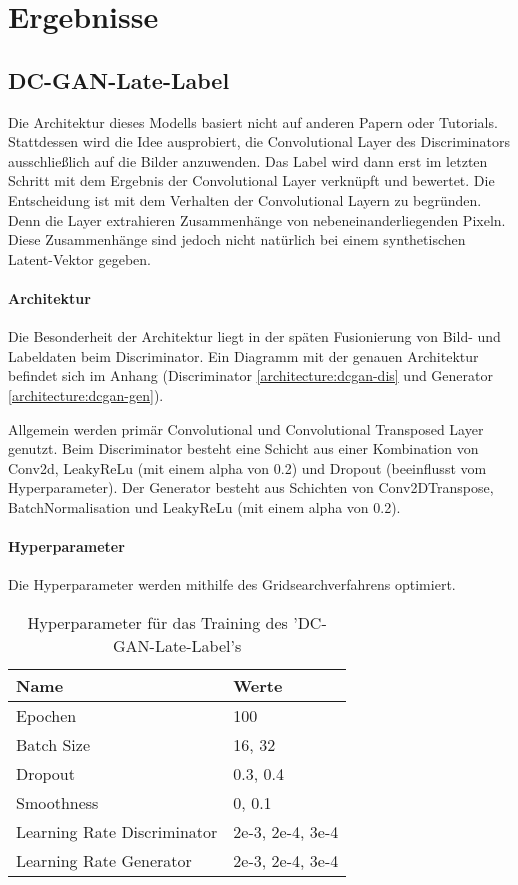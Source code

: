 
\chapter{Ergebnisse}

\section{DC-GAN-Late-Label}
\label{section:dc-gan-late-label}
Die Architektur dieses Modells basiert nicht auf anderen Papern oder Tutorials. 
Stattdessen wird die Idee ausprobiert, die Convolutional Layer des Discriminators ausschließlich auf die Bilder anzuwenden.
Das Label wird dann erst im letzten Schritt mit dem Ergebnis der Convolutional Layer verknüpft und bewertet.
Die Entscheidung ist mit dem Verhalten der Convolutional Layern zu begründen.
Denn die Layer extrahieren Zusammenhänge von nebeneinanderliegenden Pixeln.
Diese Zusammenhänge sind jedoch nicht natürlich bei einem synthetischen Latent-Vektor gegeben.

\subsubsection{Architektur}
Die Besonderheit der Architektur liegt in der späten Fusionierung von Bild- und Labeldaten beim Discriminator.
Ein Diagramm mit der genauen Architektur befindet sich im Anhang (Discriminator \cref{architecture:dcgan-dis} und Generator \cref{architecture:dcgan-gen}).


Allgemein werden primär Convolutional und Convolutional Transposed Layer genutzt.
Beim Discriminator besteht eine Schicht aus einer Kombination von Conv2d, LeakyReLu (mit einem alpha von 0.2) und Dropout (beeinflusst vom Hyperparameter).
Der Generator besteht aus Schichten von Conv2DTranspose, BatchNormalisation und LeakyReLu (mit einem alpha von 0.2).

\subsubsection{Hyperparameter}
Die Hyperparameter werden mithilfe des Gridsearchverfahrens optimiert.
\begin{table}[H]
	\centering
	\begin{tabular}{l l}
		Name                        & Werte            \\ \hline
		Epochen                     & 100              \\
		Batch Size                  & 16, 32           \\
		Dropout                     & 0.3, 0.4         \\
		Smoothness                  & 0, 0.1           \\
		Learning Rate Discriminator & 2e-3, 2e-4, 3e-4 \\
		Learning Rate Generator     & 2e-3, 2e-4, 3e-4
	\end{tabular}
	\caption{Hyperparameter für das Training des 'DC-GAN-Late-Label's}
\end{table}

